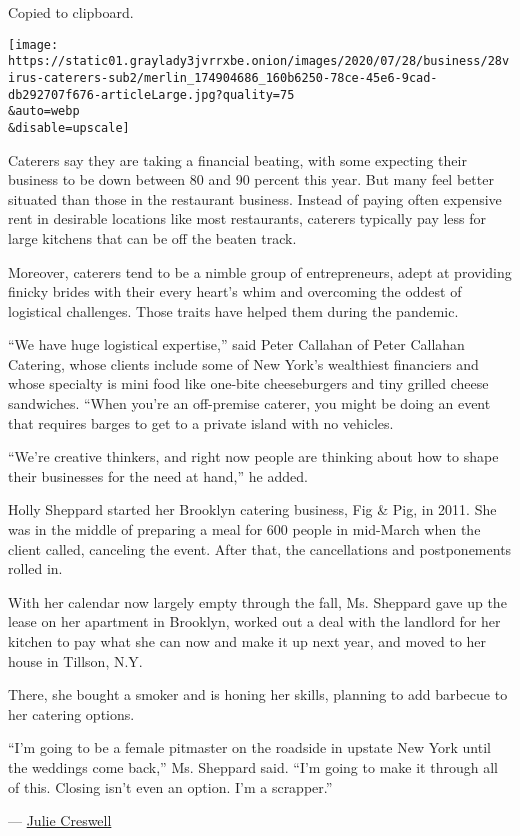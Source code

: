 Copied to clipboard.

\texttt{[image: https://static01.graylady3jvrrxbe.onion/images/2020/07/28/business/28virus-caterers-sub2/merlin\_174904686\_160b6250-78ce-45e6-9cad-db292707f676-articleLarge.jpg?quality=75\\\&auto=webp\\\&disable=upscale]}

Caterers say they are taking a financial beating, with some expecting
their business to be down between 80 and 90 percent this year. But many
feel better situated than those in the restaurant business. Instead of
paying often expensive rent in desirable locations like most
restaurants, caterers typically pay less for large kitchens that can be
off the beaten track.

Moreover, caterers tend to be a nimble group of entrepreneurs, adept at
providing finicky brides with their every heart's whim and overcoming
the oddest of logistical challenges. Those traits have helped them
during the pandemic.

``We have huge logistical expertise,'' said Peter Callahan of Peter
Callahan Catering, whose clients include some of New York's wealthiest
financiers and whose specialty is mini food like one-bite cheeseburgers
and tiny grilled cheese sandwiches. ``When you're an off-premise
caterer, you might be doing an event that requires barges to get to a
private island with no vehicles.

``We're creative thinkers, and right now people are thinking about how
to shape their businesses for the need at hand,'' he added.

Holly Sheppard started her Brooklyn catering business, Fig \& Pig, in
2011. She was in the middle of preparing a meal for 600 people in
mid-March when the client called, canceling the event. After that, the
cancellations and postponements rolled in.

With her calendar now largely empty through the fall, Ms. Sheppard gave
up the lease on her apartment in Brooklyn, worked out a deal with the
landlord for her kitchen to pay what she can now and make it up next
year, and moved to her house in Tillson, N.Y.

There, she bought a smoker and is honing her skills, planning to add
barbecue to her catering options.

``I'm going to be a female pitmaster on the roadside in upstate New York
until the weddings come back,'' Ms. Sheppard said. ``I'm going to make
it through all of this. Closing isn't even an option. I'm a scrapper.''

--- \href{https://www.nytimes3xbfgragh.onion/by/julie-creswell}{Julie
Creswell}

